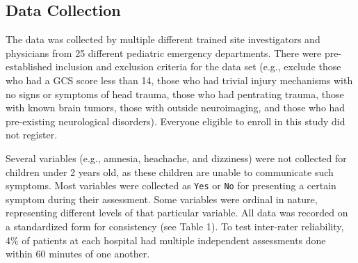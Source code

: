 \documentclass[10pt,letterpaper]{article}
\begin{document}
\subsection{Data Collection}\label{data-collection}

The data was collected by multiple different trained site investigators and physicians from 25 different pediatric emergency departments. There were pre-established inclusion and exclusion criteria for the data set (e.g., exclude those who had a GCS score less than 14, those who had trivial injury mechanisms with no signs or symptoms of head trauma, those who had pentrating trauma, those with known brain tumors, those with outside neuroimaging, and those who had pre-existing neurological disorders). Everyone eligible to enroll in this study did not register.

Several variables (e.g., amnesia, heachache, and dizziness) were not collected for children under 2 years old, as these children are unable to communicate such symptoms. Most variables were collected as \texttt{Yes} or \texttt{No} for presenting a certain symptom during their assessment. Some variables were ordinal in nature, representing different levels of that particular variable. All data was recorded on a standardized form for consistency (see Table 1). To test inter-rater reliability, 4\% of patients at each hospital had multiple independent assessments done within 60 minutes of one another.
\end{document}
